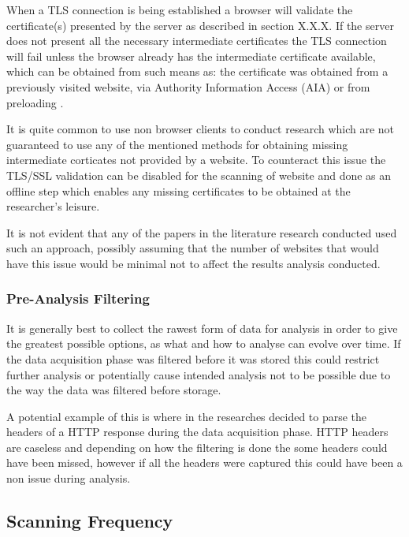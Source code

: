 \documentclass{mscreport}
\begin{document}
When a TLS connection is being established a browser will validate the certificate(s) presented by the server as described in section X.X.X. If the server does not present all the necessary intermediate certificates the TLS connection will fail unless the browser already has the intermediate certificate available, which can be obtained from such means as: the certificate was obtained from a previously visited website, via Authority Information Access (AIA) \cite{Cooper2008-yr} or from preloading \cite{Keeler2020-yj}.

\vspace{0.3cm} \noindent
It is quite common to use non browser clients to conduct research which are not guaranteed to use any of the mentioned methods for obtaining missing intermediate corticates not provided by a website. To counteract this issue the TLS/SSL validation can be disabled for the scanning of website and done as an offline step which enables any missing certificates to be obtained at the researcher’s leisure.

\vspace{0.3cm} \noindent
It is not evident that any of the papers in the literature research conducted used such an approach, possibly assuming that the number of websites that would have this issue would be minimal not to affect the results analysis conducted.

\subsubsection{Pre-Analysis Filtering}
It is generally best to collect the rawest form of data for analysis in order to give the greatest possible options, as what and how to analyse can evolve over time. If the data acquisition phase was filtered before it was stored this could restrict further analysis or potentially cause intended analysis not to be possible due to the way the data was filtered before storage.

\vspace{0.3cm} \noindent
A potential example of this is where in \cite{Buchanan2018-xz} the researches decided to parse the headers of a HTTP response during the data acquisition phase. HTTP headers are caseless \cite{Berners-Lee1996-ji} and depending on how the filtering is done the some headers could have been missed, however if all the headers were captured this could have been a non issue during analysis.

\subsection{Scanning Frequency}
\end{document}

